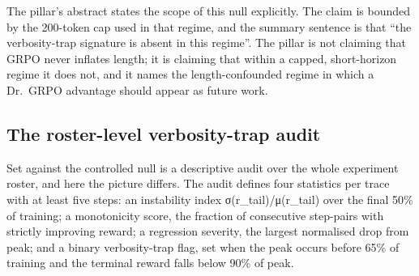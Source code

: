\documentclass[12pt,a4paper]{report}
\begin{document}
The pillar's abstract states the scope of this null explicitly. The
claim is bounded by the 200-token cap used in that regime, and the
summary sentence is that ``the verbosity-trap signature is absent in
this regime''. The pillar is not claiming that GRPO never inflates
length; it is claiming that within a capped, short-horizon regime it
does not, and it names the length-confounded regime in which a Dr.~GRPO
advantage should appear as future work.

\subsection{The roster-level verbosity-trap
audit}\label{the-roster-level-verbosity-trap-audit}

Set against the controlled null is a descriptive audit over the whole
experiment roster, and here the picture differs. The audit defines four
statistics per trace with at least five steps: an instability index
σ(r\_tail)/\textbar μ(r\_tail)\textbar{} over the final 50\% of
training; a monotonicity score, the fraction of consecutive step-pairs
with strictly improving reward; a regression severity, the largest
normalised drop from peak; and a binary verbosity-trap flag, set when
the peak occurs before 65\% of training and the terminal reward falls
below 90\% of peak.
\end{document}
